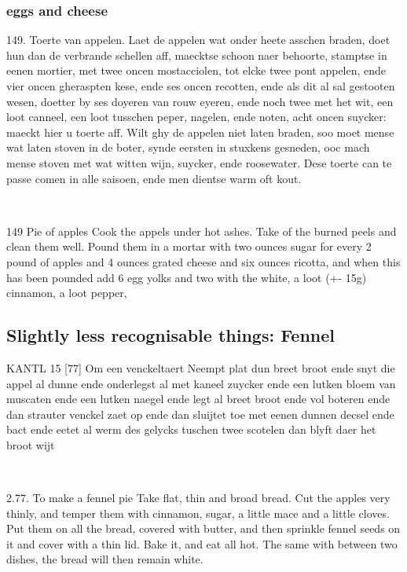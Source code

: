 \documentclass[a4paper]{article}
\begin{document}
\subsubsection{eggs and cheese}
\medskip
\begin{minipage}{.45\textwidth}
149. Toerte van appelen.
Laet de appelen wat onder heete asschen braden, doet hun dan de verbrande schellen aff, maecktse schoon naer behoorte, stamptse in eenen mortier, met twee oncen mostacciolen, tot elcke twee pont appelen, ende vier oncen gheraspten kese, ende ses oncen recotten, ende als dit al sal gestooten wesen, doetter by ses doyeren van rouw eyeren, ende noch twee met het wit, een loot canneel, een loot tusschen peper, nagelen, ende noten, acht oncen suycker: maeckt hier u toerte aff. Wilt ghy de appelen niet laten braden, soo moet mense wat laten stoven in de boter, synde eersten in stuxkens gesneden, ooc mach mense stoven met wat witten wijn, suycker, ende roosewater. Dese toerte can te passe comen in alle saisoen, ende men dientse warm oft kout.
\end{minipage}
\begin{minipage}{0.05\textwidth}
\ \ \ 
\end{minipage}
\begin{minipage}{.45\textwidth}
149 Pie of apples
Cook the appels under hot ashes. Take of the burned peels and clean them well. Pound them in a mortar with two ounces sugar for every 2 pound of apples and 4 ounces grated cheese and six ounces ricotta, and when this has been pounded add 6 egg yolks and two with the white, a loot (+- 15g) cinnamon, a loot pepper, 
\end{minipage}


\subsection{Slightly less recognisable things: Fennel}
\medskip


\medskip
\begin{minipage}{.45\textwidth}
KANTL 15
[77] Om een venckeltaert
Neempt plat dun breet broot ende snyt die appel al dunne ende onderlegst al met kaneel zuycker ende een lutken bloem van muscaten ende een lutken naegel ende legt al breet broot ende vol boteren ende dan strauter venckel zaet op ende dan sluijtet toe met eenen dunnen decsel ende bact ende eetet al werm des gelycks tuschen twee scotelen dan blyft daer het broot wijt	
\end{minipage}
\begin{minipage}{0.05\textwidth}
\ \ \ 
\end{minipage}
\begin{minipage}{.45\textwidth}
2.77. To make a fennel pie
Take flat, thin and broad bread. Cut the apples very thinly, and temper them with cinnamon, sugar, a little mace and a little cloves. Put them on all the bread, covered with butter, and then sprinkle fennel seeds on it and cover with a thin lid. Bake it, and eat all hot. The same with between two dishes, the bread will then remain white.
\end{minipage}
\ \ \ 
\end{document}
